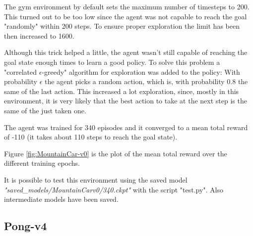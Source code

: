 \documentclass[12pt,a4paper]{article}
\begin{document}
The gym environment by default sets the maximum number of timesteps to 200. This turned out to be too low since the agent was not capable to reach the goal "randomly" within 200 steps. To ensure proper exploration the limit has been then increased to 1600.

Although this trick helped a little, the agent wasn't still capable of reaching the goal state enough times to learn a good policy. To solve this problem a "correlated $\epsilon$-greedy" algorithm for exploration was added to the policy: With probability $\epsilon$ the agent picks a random action, which is, with probability 0.8 the same of the last action. This increased a lot exploration, since, mostly in this environment, it is very likely that the best action to take at the next step is the same of the just taken one.

The agent was trained for 340 episodes and it converged to a mean total reward of -110 (it takes about 110 steps to reach the goal state). 

Figure \ref{fig:MountainCar-v0} is the plot of the mean total reward over the different training epochs.

It is possible to test this environment using the saved model \textit{"saved\_models/MountainCar\-v0/340.ckpt"} with the script "test.py". Also intermediate models have been saved.


\subsection{Pong-v4}
\end{document}
